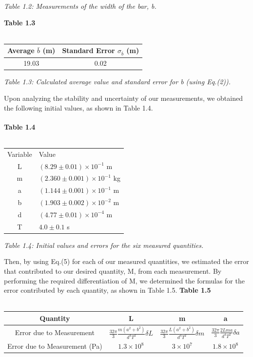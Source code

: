\documentclass[leqno]{article}
\begin{document}
\begin{flushleft}
\textit{\small Table 1.2: Measurements of the width of the bar, b.}
\end{flushleft}
\textbf{Table 1.3}\\\\
\begin{tabular}{|c|c|}
	\hline
	Average $\bar{b}$ (m) & Standard Error $\sigma_{\bar{b}}$ (m)\\
	\hline
	19.03 & 0.02\\
	\hline
\end{tabular}
\begin{flushleft}
\textit{\small Table 1.3: Calculated average value and standard error for b (using Eq.(2)).}
\end{flushleft}
Upon analyzing the stability and uncertainty of our measurements, we obtained the following initial values, as shown in Table 1.4.\\\\
\textbf{Table 1.4}\\\\
\begin{tabular}{c|l}
Variable & Value\\
L & $(8.29\pm0.01)\times10^{-1}$ m\\
m & $(2.360\pm0.001)\times 10^{-1}$ kg\\
a & $(1.144\pm0.001)\times10^{-1}$ m\\
b & $(1.903\pm0.002)\times10^{-2}$ m\\
d & $(4.77\pm0.01)\times10^{-4}$ m\\
T & $4.0 \pm 0.1$ s\\
\end{tabular}
\begin{flushleft}
\textit{\small Table 1.4: Initial values and errors for the six measured quantities.}
\end{flushleft}
Then, by using Eq.(5) for each of our measured quantities, we estimated the error that contributed to our desired quantity, M, from each measurement.
By performing the required differentiation of M, we determined the formulas for the error contributed by each quantity, as shown in Table 1.5.\newpage
\textbf{Table 1.5}\\\\
\begin{tabular}{|c|c|c|c|}
	\hline
	Quantity & L & m & a\\
	\hline
	Error due to Measurement& $\frac{32\pi}{3}\frac{m(a^2+b^2)}{d^4 T^2}\delta L$ & $\frac{32\pi}{3}\frac{L(a^2+b^2)}{d^4 T^2}\delta m$ & $\frac{32\pi}{3}\frac{2Lma}{d^4 T^2}\delta a$  \\
\hline
Error due to Measurement (Pa)& $1.3\times10^8$ & $3\times10^7$ & $1.8\times10^8$\\
\hline
\end{tabular}\\\\\\
\end{document}

